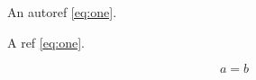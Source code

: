 \documentclass{article}
\begin{document}
An autoref \autoref{eq:one}.

A ref \ref{eq:one}.

\begin{equation}
a = b
\label{eq:one}
\end{equation}
\end{document}
